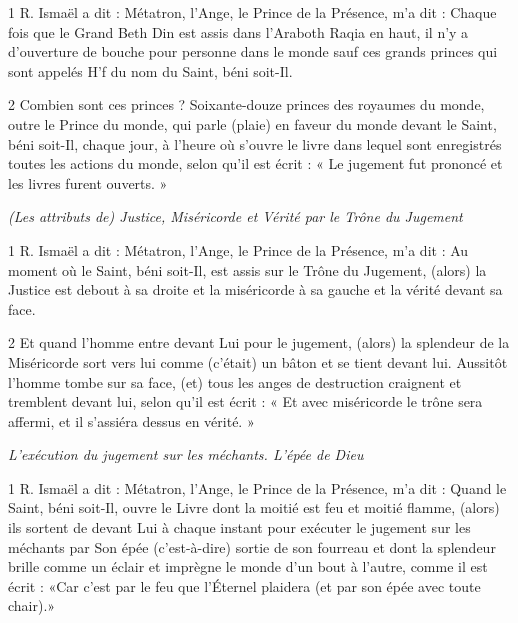 \par 1 R. Ismaël a dit : Métatron, l'Ange, le Prince de la Présence, m'a dit : Chaque fois que le Grand Beth Din est assis dans l'Araboth Raqia en haut, il n'y a d'ouverture de bouche pour personne dans le monde sauf ces grands princes qui sont appelés H'f du nom du Saint, béni soit-Il.

\par 2 Combien sont ces princes ? Soixante-douze princes des royaumes du monde, outre le Prince du monde, qui parle (plaie) en faveur du monde devant le Saint, béni soit-Il, chaque jour, à l'heure où s'ouvre le livre dans lequel sont enregistrés toutes les actions du monde, selon qu'il est écrit : « Le jugement fut prononcé et les livres furent ouverts. »


\par \textit{(Les attributs de) Justice, Miséricorde et Vérité par le Trône du Jugement}

\par 1 R. Ismaël a dit : Métatron, l'Ange, le Prince de la Présence, m'a dit : Au moment où le Saint, béni soit-Il, est assis sur le Trône du Jugement, (alors) la Justice est debout à sa droite et la miséricorde à sa gauche et la vérité devant sa face.

\par 2 Et quand l'homme entre devant Lui pour le jugement, (alors) la splendeur de la Miséricorde sort vers lui comme (c'était) un bâton et se tient devant lui. Aussitôt l'homme tombe sur sa face, (et) tous les anges de destruction craignent et tremblent devant lui, selon qu'il est écrit : « Et avec miséricorde le trône sera affermi, et il s'assiéra dessus en vérité. »


\par \textit{L'exécution du jugement sur les méchants. L'épée de Dieu}

\par 1 R. Ismaël a dit : Métatron, l'Ange, le Prince de la Présence, m'a dit : Quand le Saint, béni soit-Il, ouvre le Livre dont la moitié est feu et moitié flamme, (alors) ils sortent de devant Lui à chaque instant pour exécuter le jugement sur les méchants par Son épée (c'est-à-dire) sortie de son fourreau et dont la splendeur brille comme un éclair et imprègne le monde d'un bout à l'autre, comme il est écrit : «Car c'est par le feu que l'Éternel plaidera (et par son épée avec toute chair).»

